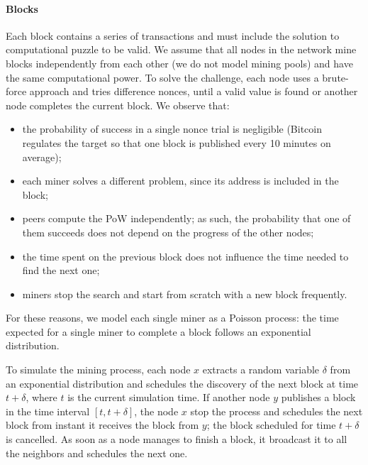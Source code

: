 \paragraph{Blocks}
Each block contains a series of transactions and must include the solution to computational puzzle to be valid.
We assume that all nodes in the network mine blocks independently from each other (we do not model mining pools) and have the same computational power.
To solve the challenge, each node uses a brute-force approach and tries difference nonces, until a valid value is found or another node completes the current block.
We observe that:
\begin{itemize}
	\item the probability of success in a single nonce trial is negligible (Bitcoin regulates the target so that one block is published every \num{10} minutes on average);
	\item each miner solves a different problem, since its address is included in the block;
	\item peers compute the \ac{PoW} independently; as such, the probability that one of them succeeds does not depend on the progress of the other nodes;
	\item the time spent on the previous block does not influence the time needed to find the next one;
	\item miners stop the search and start from scratch with a new block frequently.
\end{itemize}
For these reasons, we model each single miner as a Poisson process:
the time expected for a single miner to complete a block follows an exponential distribution.

\medskip
To simulate the mining process, each node $x$ extracts a random variable $\delta$ from an exponential distribution and schedules the discovery of the next block at time $t + \delta$, where $t$ is the current simulation time.
If another node $y$ publishes a block in the time interval $[t, t + \delta]$, the node $x$ stop the process and schedules the next block from instant it receives the block from $y$;
the block scheduled for time $t + \delta$ is cancelled.
As soon as a node manages to finish a block, it broadcast it to all the neighbors and schedules the next one.

